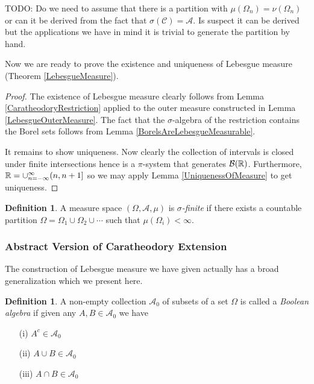 \documentclass{amsart}
\theoremstyle{remark}
\theoremstyle{definition}
\newtheorem{defn}[thm]{Definition}
\begin{document}
TODO: Do we need to assume that there is a partition with
$\mu(\Omega_n) = \nu(\Omega_n)$ or can it be derived from the fact
that $\sigma(\mathcal{C}) = \mathcal{A}$.  Is suspect it can be
derived but the applications we have in mind it is trivial to generate
the partition by hand.

 Now we are ready to prove the existence and uniqueness of Lebesgue
measure (Theorem \ref{LebesgueMeasure}).

\begin{proof}The existence of Lebesgue measure clearly follows from
  Lemma \ref{CaratheodoryRestriction} applied to the outer measure
  constructed in Lemma \ref{LebesgueOuterMeasure}.  The fact that the
  $\sigma$-algebra of the restriction contains the Borel sets follows
  from Lemma \ref{BorelsAreLebesgueMeasurable}.

It remains to show uniqueness.  Now clearly the collection of intervals is closed under finite
intersections hence is a $\pi$-system that generates
$\mathcal{B}(\mathbb{R})$.  Furthermore, $\mathbb{R} =
\cup_{n=-\infty}^\infty (n, n+1]$ so we may apply Lemma
\ref{UniquenessOfMeasure} to get uniqueness.
\end{proof}

\begin{defn}A measure space $(\Omega, \mathcal{A}, \mu)$ is
  \emph{$\sigma$-finite} if there exists a countable partition $\Omega
  = \Omega_1 \cup \Omega_2 \cup \cdots$ such that $\mu(\Omega_i) < \infty$.
\end{defn}

\subsubsection{Abstract Version of Caratheodory Extension}
The construction of Lebesgue measure we have given actually has a
broad generalization which we present here.

\begin{defn}A non-empty collection $\mathcal{A}_0$ of subsets of a set
  $\Omega$ is called a \emph{Boolean  algebra} if given any $A, B
  \in \mathcal{A}_0$ we have
\begin{itemize}
\item[(i)]$A^c \in \mathcal{A}_0$
\item[(ii)]$A \cup B \in \mathcal{A}_0$
\item[(iii)]$A \cap B \in \mathcal{A}_0$
\end{itemize}
\end{defn}
\end{document}
